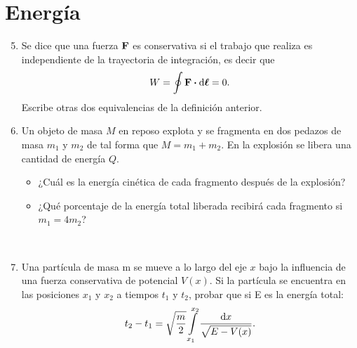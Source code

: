 \documentclass[letterpaper]{article}
\newcommand{\salirmodo}{\leavevmode \\}
\begin{document}
\section*{Energía}
\begin{enumerate}[label=\textbf{2.\arabic*)}]
    \setcounter{enumi}{4}
    \item Se dice que una fuerza \(\vb{F}\) es conservativa si el trabajo que realiza es independiente de la trayectoria de integración, es decir que
    \begin{equation*}
        W = \oint \vb{F}\vdot \dd{\bm{\ell}} = 0.
    \end{equation*}
    Escribe otras dos equivalencias de la definición anterior.\salirmodo
    \item Un objeto de masa \(M\) en reposo explota y se fragmenta en dos pedazos de masa \(m_{1}\) y \(m_{2}\) de tal forma que \(M = m_{1}+m_{2}\). En la explosión se libera una cantidad de energía \(Q\).
    \begin{itemize}[label = \textbullet]
        \item ¿Cuál es la energía cinética de cada fragmento después de la explosión?
        \item ¿Qué porcentaje de la energía total liberada recibirá cada fragmento si \(m_{1} = 4 m_{2}\)?
    \end{itemize}
    \salirmodo
    \item Una partícula de masa m se mueve a lo largo del eje \(x\) bajo la influencia de una fuerza conservativa de potencial \(V(x)\). Si la partícula se encuentra en las posiciones \(x_{1}\) y \(x_{2}\) a tiempos \(t_{1}\) y \(t_{2}\), probar que si E es la energía total:
    \begin{align*}
        t_{2}-t_{1}=\sqrt{\frac{m}{2}}\int\displaylimits_{x_{1}}^{x_{2}}\frac{\dd{x}}{\sqrt{E-V(x)}}.
    \end{align*}\salirmodo
\end{enumerate}
\end{document}
